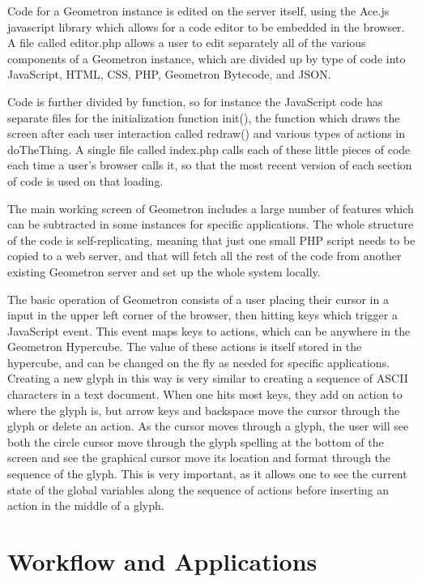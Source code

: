 \documentclass[11pt]{article}
\begin{document}
    Code for a Geometron instance is edited on the server itself, using the Ace.js javascript library which allows for a code editor to be embedded in the browser.   A file called editor.php allows a user to edit separately all of the various components of a Geometron instance, which are divided up by type of code into JavaScript, HTML, CSS, PHP, Geometron Bytecode, and JSON.  

    Code is further divided by function, so for instance the JavaScript code has separate files for the initialization function init(), the function which draws the screen after each user interaction called redraw() and various types of actions in doTheThing.  A single file called index.php calls each of these little pieces of code each time a user's browser calls it, so that the most recent version of each section of code is used on that loading.  

    The main working screen of Geometron includes a large number of features which can be subtracted in some instances for specific applications.  The whole structure of the code is self-replicating, meaning that just one small PHP script needs to be copied to a web server, and that will fetch all the rest of the code from another existing Geometron server and set up the whole system locally.  

    The basic operation of Geometron consists of a user placing their cursor in a input in the upper left corner of the browser, then hitting keys which trigger a JavaScript event.  This event maps keys to actions, which can be anywhere in the Geometron Hypercube.  The value of these actions is itself stored in the hypercube, and can be changed on the fly as needed for specific applications.  Creating a new glyph in this way is very similar to creating a sequence of ASCII characters in a text document.  When one hits most keys, they add on action to where the glyph is, but arrow keys and backspace move the cursor through the glyph or delete an action.  As the cursor moves through a glyph, the user will see both the circle cursor move through the glyph spelling at the bottom of the screen and see the graphical cursor move its location and format through the sequence of the glyph.  This is very important, as it allows one to see the current state of the global variables along the sequence of actions before inserting an action in the middle of a glyph.  




\section{Workflow and Applications}
\end{document}
